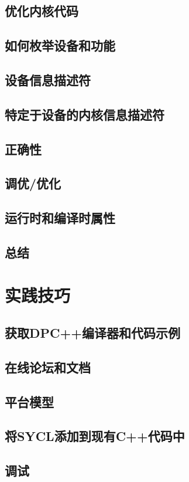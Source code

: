 \documentclass[11pt,a4paper,UTF8]{ctexart}
\begin{document}
		\subsection{优化内核代码}
		\subsection{如何枚举设备和功能}
		\subsection{设备信息描述符}
		\subsection{特定于设备的内核信息描述符}
		\subsection{正确性}
		\subsection{调优/优化}
		\subsection{运行时和编译时属性}
		\subsection{总结}
	\section{实践技巧}
		\subsection{获取DPC++编译器和代码示例}
		\subsection{在线论坛和文档}
		\subsection{平台模型}
		\subsection{将SYCL添加到现有C++代码中}
		\subsection{调试}
\end{document}

